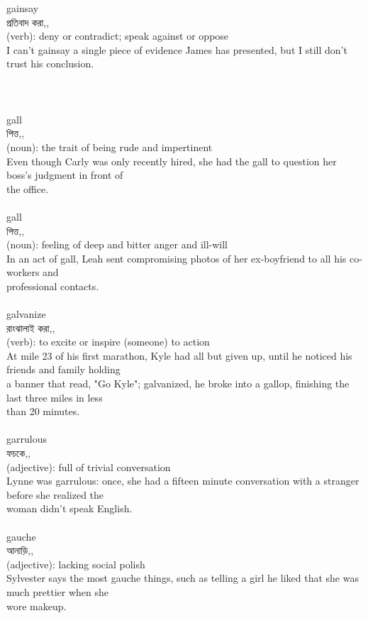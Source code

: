 \documentclass{article}
\begin{document}
{gainsay}\\
{প্রতিবাদ করা,,}\\
{(verb): deny or contradict; speak against or oppose\\I can't gainsay a single piece of evidence James has presented, but I still don't trust his conclusion.\\\\                                                                                \\}\\
{gall}\\
{পিত্ত,,}\\
{(noun): the trait of being rude and impertinent\\Even though Carly was only recently hired, she had the gall to question her boss's judgment in front of\\the office.\\}\\
{gall}\\
{পিত্ত,,}\\
{(noun): feeling of deep and bitter anger and ill-will\\In an act of gall, Leah sent compromising photos of her ex-boyfriend to all his co-workers and\\professional contacts.\\}\\
{galvanize}\\
{রাংঝালাই করা,,}\\
{(verb): to excite or inspire (someone) to action\\At mile 23 of his first marathon, Kyle had all but given up, until he noticed his friends and family holding\\a banner that read, "Go Kyle"; galvanized, he broke into a gallop, finishing the last three miles in less\\than 20 minutes.\\}\\
{garrulous}\\
{ফচকে,,}\\
{(adjective): full of trivial conversation\\Lynne was garrulous: once, she had a fifteen minute conversation with a stranger before she realized the\\woman didn't speak English.\\}\\
{gauche}\\
{আনাড়ি,,}\\
{(adjective): lacking social polish\\Sylvester says the most gauche things, such as telling a girl he liked that she was much prettier when she\\wore makeup.\\}\\
\end{document}
